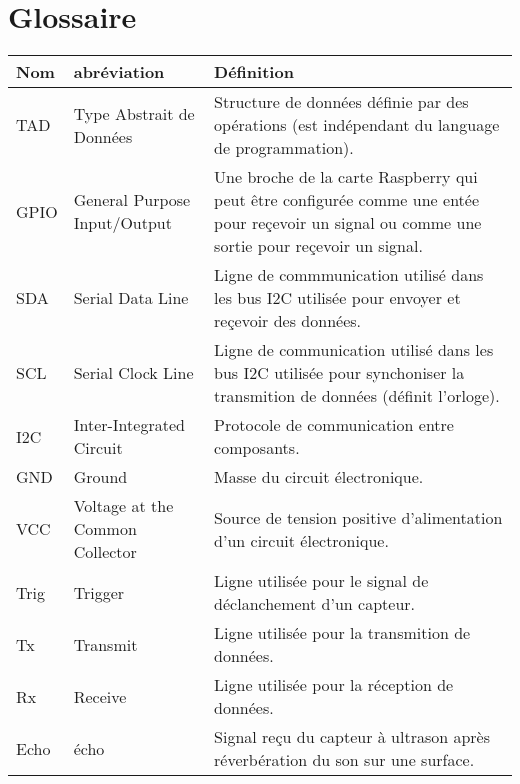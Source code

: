 \newpage
\section{Glossaire}
    \begin{table}[ht]
        \begin{adjustwidth}{-3cm}{-3cm}
            \centering
            \begin{tabular}{|p{1cm}|p{5cm}|p{10cm}|}
                \hline
                \textbf{Nom} & \textbf{abréviation} & \textbf{Définition}\\
                \hline
                TAD & Type Abstrait de Données & Structure de données définie par des opérations (est indépendant du language de programmation).\\
                \hline
                GPIO & General Purpose Input/Output & Une broche de la carte Raspberry qui peut être configurée comme une entée pour reçevoir un signal ou comme une sortie pour reçevoir un signal.\\ 
                \hline
                SDA & Serial Data Line & Ligne de commmunication utilisé dans les bus I2C utilisée pour envoyer et reçevoir des données.\\
                \hline
                SCL & Serial Clock Line & Ligne de communication utilisé dans les bus I2C utilisée pour synchoniser la transmition de données (définit l'orloge).\\
                \hline
                I2C & Inter-Integrated Circuit & Protocole de communication entre composants.\\
                \hline
                GND & Ground & Masse du circuit électronique.\\
                \hline
                VCC & Voltage at the Common Collector & Source de tension positive d'alimentation d'un circuit électronique.\\
                \hline
                Trig & Trigger & Ligne utilisée pour le signal de déclanchement d'un capteur.\\
                \hline
                Tx & Transmit & Ligne utilisée pour la transmition de données.\\
                \hline
                Rx & Receive & Ligne utilisée pour la réception de données.\\
                \hline
                Echo & écho & Signal reçu du capteur à ultrason après réverbération du son sur une surface.\\
                \hline

\end{tabular}
\end{adjustwidth}
\end{table}
